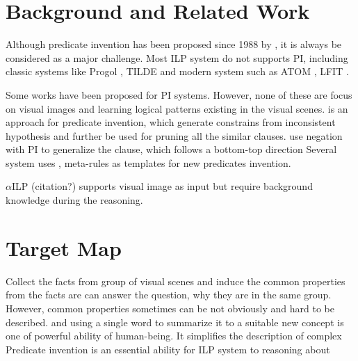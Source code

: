\documentclass[
]{ceurart}
\begin{document}
\section{Background and Related Work}

Although predicate invention has been proposed since 1988 by \cite{MUGGLETON1988339}, it is always be considered as a major challenge. Most ILP system do not supports PI, including classic systems like Progol \cite{Muggleton1995InverseEA}, TILDE\cite{BLOCKEEL1998285} and modern system such as ATOM \cite{atom}, LFIT \cite{LFIT}.

Some works have been proposed for PI systems. However, none of these are focus on visual images and learning logical patterns existing in the visual scenes. 
\cite{pilff} is an approach for predicate invention, which generate constrains from inconsistent hypothesis and further be used for pruning all the similar clauses. \cite{gtnpi} use negation with PI to generalize the clause, which follows a bottom-top direction 
Several system uses \cite{Evans2018}, \cite{kaminski_eiter_inoue_2018} meta-rules as templates for new predicates invention. 

$ \alpha $ILP (citation?) supports visual image as input but require background knowledge during the reasoning.


 
 

\section{Target Map}





Collect the facts from group of visual scenes and induce the common properties from the facts are 
can answer the question, why they are in the same group. However, common properties sometimes can be not obviously and hard to be described.
and using a single word  to summarize it to a suitable new concept is one of powerful ability of human-being. It simplifies the description of complex 
Predicate invention is an essential ability for ILP system to reasoning about 
\end{document}
